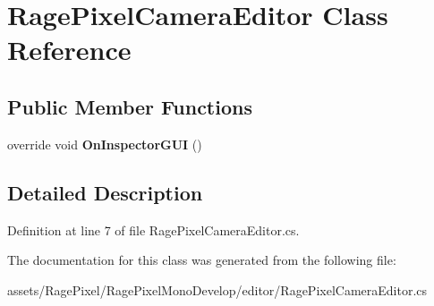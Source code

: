 \hypertarget{class_rage_pixel_camera_editor}{\section{Rage\-Pixel\-Camera\-Editor Class Reference}
\label{class_rage_pixel_camera_editor}
}
\subsection*{Public Member Functions}
\begin{DoxyCompactItemize}
\item 
\hypertarget{class_rage_pixel_camera_editor_ac2dfa8ba0c03ed9ab3d641f6f88c41b6}{override void {\bfseries On\-Inspector\-G\-U\-I} ()}\label{class_rage_pixel_camera_editor_ac2dfa8ba0c03ed9ab3d641f6f88c41b6}

\end{DoxyCompactItemize}


\subsection{Detailed Description}


Definition at line 7 of file Rage\-Pixel\-Camera\-Editor.\-cs.



The documentation for this class was generated from the following file\-:\begin{DoxyCompactItemize}
\item 
assets/\-Rage\-Pixel/\-Rage\-Pixel\-Mono\-Develop/editor/Rage\-Pixel\-Camera\-Editor.\-cs\end{DoxyCompactItemize}

